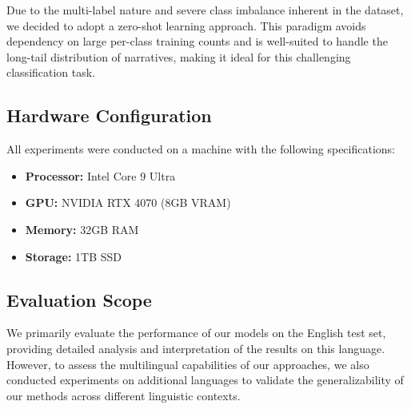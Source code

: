 Due to the multi-label nature and severe class imbalance inherent in the dataset, we decided to adopt a zero-shot learning approach. This paradigm avoids dependency on large per-class training counts and is well-suited to handle the long-tail distribution of narratives, making it ideal for this challenging classification task.

\subsection{Hardware Configuration}

All experiments were conducted on a machine with the following specifications:
\begin{itemize}
\item \textbf{Processor:} Intel Core 9 Ultra
\item \textbf{GPU:} NVIDIA RTX 4070 (8GB VRAM)
\item \textbf{Memory:} 32GB RAM
\item \textbf{Storage:} 1TB SSD
\end{itemize}

\subsection{Evaluation Scope}

We primarily evaluate the performance of our models on the English test set, providing detailed analysis and interpretation of the results on this language. However, to assess the multilingual capabilities of our approaches, we also conducted experiments on additional languages to validate the generalizability of our methods across different linguistic contexts.